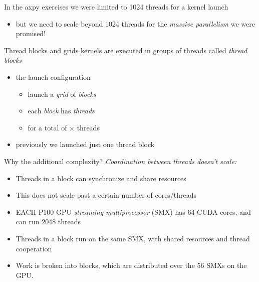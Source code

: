 \documentclass[aspectratio=43]{beamer}
\newcommand{\axpy}{{\ttfamily axpy}\xspace}
\begin{document}
\begin{frame}[fragile]{}
    \begin{info}{}
        In the \axpy exercises we were limited to 1024 threads for a kernel launch
        \begin{itemize}
            \item but we need to scale beyond 1024 threads for the \emph{massive parallelism} we were promised!
        \end{itemize}
    \end{info}

    \begin{info}{Thread blocks and grids}
        kernels are executed in groups of threads called \emph{thread blocks}
        \vspace{-12pt}
        \begin{itemize}
            \item the launch configuration 
            \begin{itemize}
                \item launch a \emph{grid} of  \emph{blocks}
                \item each \emph{block} has  \emph{threads}
                \item for a total of $\times$ threads
            \end{itemize}
            \item previously we launched just one thread block 
        \end{itemize}
    \end{info}

\end{frame}

\begin{frame}[fragile]{Why the additional complexity?}
        \emph{Coordination between threads doesn't scale:}
        \begin{itemize}
            \item Threads in a block can synchronize and share resources
            \item This does not scale past a certain number of cores/threads
            \item EACH P100 GPU \emph{streaming multiprocessor} (SMX) has 64 CUDA cores, and can run 2048 threads
            \item Threads in a block run on the same SMX, with shared resources and thread cooperation
            \item Work is broken into blocks, which are distributed over the 56 SMXs on the GPU.
        \end{itemize}
\end{frame}
\end{document}
